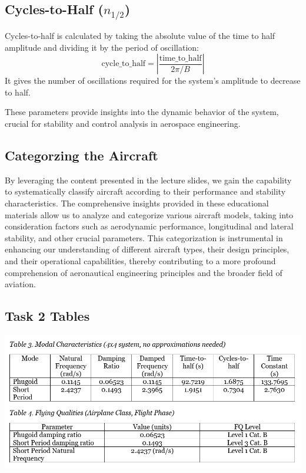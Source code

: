 \documentclass[a4paper, twoside]{article}
\begin{document}
\subsection*{Cycles-to-Half (\(n_{1/2}\))}

Cycles-to-half is calculated by taking the absolute value of the time to half amplitude and dividing it by the period of oscillation:
\[ \text{cycle\_to\_half} = \left|\frac{\text{time\_to\_half}}{2\pi / B}\right| \]
It gives the number of oscillations required for the system's amplitude to decrease to half.

These parameters provide insights into the dynamic behavior of the system, crucial for stability and control analysis in aerospace engineering.
\subsection{Categorzing the Aircraft}
By leveraging the content presented in the lecture slides, we gain the capability to systematically classify aircraft according 
to their performance and stability characteristics. 
The comprehensive insights provided in these educational materials allow us to analyze and categorize various aircraft models,
 taking into consideration factors such as aerodynamic performance, longitudinal and lateral stability, and other crucial parameters.
  This categorization is instrumental in enhancing our understanding of different aircraft types, 
  their design principles, and their operational capabilities, thereby contributing to a more profound comprehension of 
  aeronautical engineering principles and the broader field of aviation.
\subsection{Task 2 Tables}
\begin{center}
\includegraphics[width=\linewidth]{table-2-1.png}
\end{center}
\pagebreak
\end{document}
